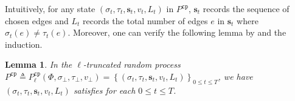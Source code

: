 \documentclass[11pt]{article}
\newtheorem{lemma}[theorem]{Lemma}
\newtheorem{corollary}[theorem]{Corollary}
\newcommand{\set}[1]{\left\{#1\right\}}
\def\!#1{\mathtt{#1}}
\newcommand{\seqS}{\boldsymbol{s}}
\begin{document}
Intuitively, for any state $(\sigma_t, \tau_t, \seqS_t, v_t, L_t)$ in $P^{\!{cp}}$, $\seqS_t$ records the sequence of chosen edges and $L_t$ records the total number of edges $e$ in $\seqS_t$ where $\sigma_t(e)\neq \tau_t(e)$.
Moreover, one can verify the following lemma by  and the induction.



\begin{lemma}\label{lemma-trp-correctness}
In the $\ell$-truncated random process $P^{\!{cp}} \triangleq P^{\!{cp}}_\ell(\Phi, \sigma_\bot, \tau_\bot, v_\bot) = \set{(\sigma_t, \tau_t, \seqS_t, v_t, L_t)}_{0\leq t \leq T}$, we have 
$(\sigma_t, \tau_t,\seqS_t, v_t, L_t)$ satisfies  for each $0\leq t \leq T$.
\end{lemma}



\end{document}
